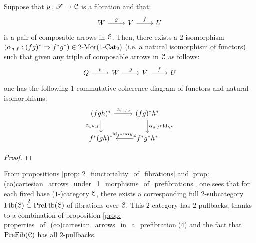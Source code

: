            \begin{proposition} \label{prop: 2_functoriality_of_fibrations}
                Suppose that $p: \mathscr{S} \to \mathcal{C}$ is a fibration and that:
                    $$
                        \begin{tikzcd}
                        	W & V & U
                        	\arrow["g", from=1-1, to=1-2]
                        	\arrow["f", from=1-2, to=1-3]
                        \end{tikzcd}
                    $$
                is a pair of composable arrows in $\mathcal{C}$. Then, there exists a $2$-isomorphism $(\alpha_{g, f}: (fg)^* \Rightarrow f^*g^*) \in 2\text{-}\mathrm{Mor}(1\text{-}\mathrm{Cat}_2)$ (i.e. a natural isomorphism of functors) such that given any triple of composable arrows in $\mathcal{C}$ as follows:
                    $$
                        \begin{tikzcd}
                        	Q & W & V & U
                        	\arrow["g", from=1-2, to=1-3]
                        	\arrow["f", from=1-3, to=1-4]
                        	\arrow["h", from=1-1, to=1-2]
                        \end{tikzcd}
                    $$
                one has the following $1$-commutative coherence diagram of functors and natural isomorphisms:
                    $$
                        \begin{tikzcd}
                        	{(fgh)^*} & {(fg)^*h^*} \\
                        	{f^*(gh)^*} & {f^*g^*h^*}
                        	\arrow["{\alpha_{gh, f}}"', from=1-1, to=2-1]
                        	\arrow["{\id_{f^*} \circ \alpha_{h, g}}"', from=2-2, to=2-1]
                        	\arrow["{\alpha_{g, f} \circ \id_{h^*}}", from=1-2, to=2-2]
                        	\arrow["{\alpha_{h, fg}}", from=1-1, to=1-2]
                        \end{tikzcd}
                    $$
            \end{proposition}
                \begin{proof}
                            
                \end{proof}
            \begin{corollary} \label{coro: 2_categories_of_fibrations}
                From propositions \ref{prop: 2_functoriality_of_fibrations} and \ref{prop: (co)cartesian_arrows_under_1_morphisms_of_prefibrations}, one sees that for each fixed base ($1$-)category $\mathcal{C}$, there exists a corresponding full $2$-subcategory $\mathrm{Fib}(\mathcal{C}) \overset{2}{\subset} \mathrm{Pre}\mathrm{Fib}(\mathcal{C})$ of fibrations over $\mathcal{C}$. This $2$-category has $2$-pullbacks, thanks to a combination of proposition \ref{prop: properties_of_(co)cartesian_arrows_in_a_prefibration}(4) and the fact that $\mathrm{Pre}\mathrm{Fib}(\mathcal{C})$ has all $2$-pullbacks.
            \end{corollary}
            
